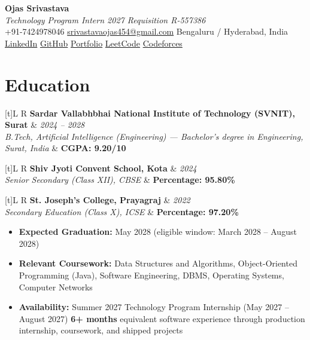 \documentclass[a4paper,10pt]{article}
\newcommand{\resumeEdu}[4]{%
  \noindent\begin{tabularx}{\textwidth}[t]{L R}%
    \textbf{#1} & \textit{\footnotesize #2} \\%
    \textit{\footnotesize #3} & \textbf{\footnotesize #4} \\%
  \end{tabularx}\vspace{-0.5mm}%
}
\begin{document}
\selectfont

\begin{center}
  {\LARGE \textbf{Ojas Srivastava}} \\[0.5mm]
  \small\textit{Technology Program Intern 2027 \textbar{} Requisition R-557386} \\[0.5mm]
  \small
  +91-7424978046 \textbar{}
  \href{mailto:srivastavaojas454@gmail.com}{srivastavaojas454@gmail.com} \textbar{}
  Bengaluru / Hyderabad, India \\[0.5mm]
  \href{https://linkedin.com/in/ojas-srivastava05}{LinkedIn} \textbar{}
  \href{https://github.com/Ojas-Srivastava05}{GitHub} \textbar{}
  \href{https://ojas-srivastava.vercel.app}{Portfolio} \textbar{}
  \href{https://leetcode.com/Oju_Srivastava}{LeetCode} \textbar{}
  \href{https://codeforces.com/profile/Oju}{Codeforces}
\end{center}

\vspace{-2mm}

\section{Education}
\small
\resumeEdu
  {Sardar Vallabhbhai National Institute of Technology (SVNIT), Surat}
  {2024 -- 2028}
  {B.Tech, Artificial Intelligence (Engineering) --- Bachelor's degree in Engineering, Surat, India}
  {CGPA: 9.20/10}
\resumeEdu
  {Shiv Jyoti Convent School, Kota}
  {2024}
  {Senior Secondary (Class XII), CBSE}
  {Percentage: 95.80\%}
\resumeEdu
  {St. Joseph's College, Prayagraj}
  {2022}
  {Secondary Education (Class X), ICSE}
  {Percentage: 97.20\%}
\vspace{1mm}
\begin{itemize}[leftmargin=*, topsep=2pt, itemsep=0pt, parsep=0pt]
  \item \textbf{Expected Graduation:} May 2028 (eligible window: March 2028 -- August 2028)
  \item \textbf{Relevant Coursework:} Data Structures and Algorithms, Object-Oriented Programming (Java), Software Engineering, DBMS, Operating Systems, Computer Networks
  \item \textbf{Availability:} Summer 2027 Technology Program Internship (May 2027 -- August 2027) \textbar{} \textbf{6+ months} equivalent software experience through production internship, coursework, and shipped projects
\end{itemize}
\end{document}
